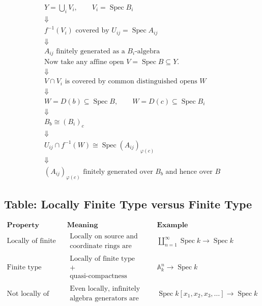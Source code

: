 \documentclass[12pt,a4paper]{article}
\theoremstyle{notespace}
\begin{document}
\[
\begin{array}{c}
	\boxed{
		Y=\bigcup_i V_i,\qquad V_i=\operatorname{Spec}B_i
	}
	\\[1em]
	\Downarrow
	\\[1em]
	\boxed{
		f^{-1}(V_i)
		\text{ covered by }
		U_{ij}=\operatorname{Spec}A_{ij}
	}
	\\[1em]
	\Downarrow
	\\[1em]
	\boxed{
		A_{ij}
		\text{ finitely generated as a }
		B_i\text{-algebra}
	}
	\\[2em]
	\text{Now take any affine open } V=\operatorname{Spec}B\subseteq Y.
	\\[1em]
	\Downarrow
	\\[1em]
	\boxed{
		V\cap V_i
		\text{ is covered by common distinguished opens }
		W
	}
	\\[1em]
	\Downarrow
	\\[1em]
	\boxed{
		W=D(b)\subseteq \operatorname{Spec}B,
		\qquad
		W=D(c)\subseteq \operatorname{Spec}B_i
	}
	\\[1em]
	\Downarrow
	\\[1em]
	\boxed{
		B_b\cong (B_i)_c
	}
	\\[1em]
	\Downarrow
	\\[1em]
	\boxed{
		U_{ij}\cap f^{-1}(W)
		\cong
		\operatorname{Spec}(A_{ij})_{\varphi(c)}
	}
	\\[1em]
	\Downarrow
	\\[1em]
	\boxed{
		(A_{ij})_{\varphi(c)}
		\text{ finitely generated over }
		B_b
		\text{ and hence over } B
	}
\end{array}
\]

\subsection{Table: Locally Finite Type versus Finite Type}

\[
\begin{array}{c|c|c}
	\textbf{Property}
	& \textbf{Meaning}
	& \textbf{Example}
	\\
	\hline
	\text{Locally of finite type}
	&
	\begin{array}{c}
		\text{Locally on source and target,} \\
		\text{coordinate rings are finitely generated}
	\end{array}
	&
	\coprod_{n=1}^{\infty}\operatorname{Spec}k
	\to
	\operatorname{Spec}k
	\\
	\hline
	\text{Finite type}
	&
	\begin{array}{c}
		\text{Locally of finite type} \\
		+ \\
		\text{quasi-compactness}
	\end{array}
	&
	\mathbb{A}^n_k\to \operatorname{Spec}k
	\\
	\hline
	\text{Not locally of finite type}
	&
	\begin{array}{c}
		\text{Even locally, infinitely many} \\
		\text{algebra generators are needed}
	\end{array}
	&
	\operatorname{Spec}k[x_1,x_2,x_3,\dots]
	\to
	\operatorname{Spec}k
\end{array}
\]
\end{document}
